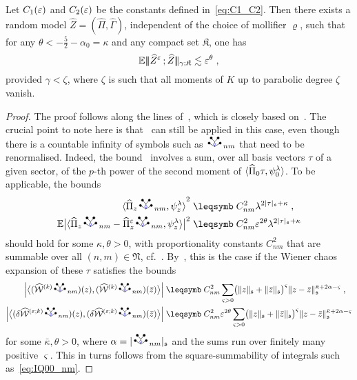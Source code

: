\documentclass[reqno,11pt]{article}
\def\seminormff#1#2{|\!|\!|#1\,\mathord{;}\,#2|\!|\!|}
\def\fraks{\mathfrak{s}}
\def\fraK{\mathfrak{K}}
\def\abss#1{\abs{#1}_\mathfrak{s}}
\newcommand{\setnm}{\mathfrak{N}}
\begin{document}
\begin{prop}
Let $C_1(\varepsilon)$ and $C_2(\varepsilon)$ be the constants defined in~\eqref{eq:C1_C2}. 
Then there exists a random model $\widehat Z = (\widehat \Pi,\widehat \Gamma)$, 
independent of the choice of mollifier $\varrho$, such that for any $\theta < 
-\frac52 - \alpha_0 = \kappa$ and any compact set $\fraK$, one has 
\begin{equation}
 \E \seminormff{\widehat Z^\eps}{\widehat Z}_{\gamma;\fraK} \lesssim 
\eps^\theta\;,
\end{equation} 
provided $\gamma < \zeta$, where $\zeta$ is such that all moments of $K$ up to 
parabolic degree $\zeta$ vanish. 
\end{prop}
%
\begin{proof}
The proof follows along the lines of~\cite[Prop.~6.4]{BK2016}, which is closely 
based on~\cite[Thm.~10.22]{Hairer2014}. The crucial point to note here is 
that~\cite[Thm.~10.7]{Hairer2014} can still be applied in this case, even though 
there is a countable infinity of symbols such as $\RSoWV_{nm}$ that need to be 
renormalised. Indeed, the bound~\cite[(10.4)]{Hairer2014} involves a sum, over 
all basis vectors $\tau$ of a given sector, of the $p$-th power of the second 
moment of $\langle\widehat\Pi_0\tau,\psi^\lambda_0\rangle$. To be applicable, the 
bounds
\begin{align}
\nonumber
{\pscal{\widehat \Pi_z\RSoWV_{nm}}{\psi^\lambda_z}}^2 
&
\leqs C^2_{nm} \lambda^{2\abs{\tau}_\fraks+\kappa}\;, \\
\E\bigabs{\pscal{\widehat \Pi_z\RSoWV_{nm} - \widehat
\Pi_z^{\eps}\RSoWV_{nm}}{\psi^\lambda_z}}^2 
&
\leqs C^2_{nm} \eps^{2\theta}\lambda^{2\abs{\tau}_\fraks+\kappa}
\end{align}
should hold for some $\kappa, \theta > 0$, with proportionality 
constants $C^2_{nm}$ that are summable over all $(n,m)\in\setnm$, 
cf.~\cite[(10.2), (10.3)]{Hairer2014}.
By~\cite[Prop.~10.11]{Hairer2014}, this is the case if 
the Wiener chaos expansion of these $\tau$ satisfies the 
bounds
\begin{align}
\nonumber
\Bigabs{\bigpscal{(\widehat\cW^{(k)}\RSoWV_{nm})(z)}{(\widehat\cW^{(k)}
\RSoWV_{nm})(\bar z)}}
&\leqs C_{nm}^2 \sum_{\varsigma>0} \bigpar{\norm{z}_{\fraks} +
\norm{\bar z}_{\fraks}}^\varsigma \norm{z-\bar
z}_{\fraks}^{\bar\kappa+2\alpha-\varsigma}\;, \\
\Bigabs{\bigpscal{(\delta\widehat\cW^{(\eps;k)}\RSoWV_{nm})(z)}
{(\delta\widehat\cW^{(\eps;k)} \RSoWV_{nm})(\bar z)}}
&
\leqs C_{nm}^2 \eps^{2\theta} \sum_{\varsigma>0} 
\bigpar{\norm{z}_{\fraks} +
\norm{\bar z}_{\fraks}}^\varsigma \norm{z-\bar
z}_{\fraks}^{\bar\kappa+2\alpha-\varsigma}
\label{eq:rFHN04c}
\end{align}
for some $\bar\kappa,\theta>0$, where $\alpha=\abss{\RSoWV_{nm}}$ and the sums 
run over finitely many positive $\varsigma$. This in turns follows from the 
square-summability of integrals such as~\eqref{eq:IQ00_nm}. 
\end{proof}
\end{document}
